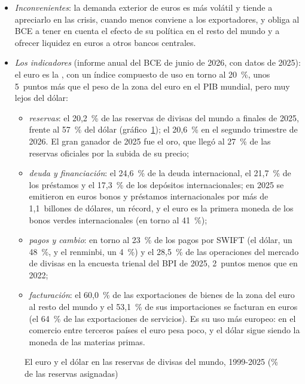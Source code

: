 \documentclass[11pt]{article}
\begin{document}
\begin{itemize}
\begin{itemize}
  \end{itemize}
\item \emph{Inconvenientes}: la demanda exterior de euros es más volátil y tiende a apreciarlo en las crisis, cuando menos conviene a los exportadores, y obliga al BCE a tener en cuenta el efecto de su política en el resto del mundo y a ofrecer liquidez en euros a otros bancos centrales.
\item \emph{Los indicadores} (informe anual del BCE de junio de 2026, con datos de 2025)\nocite{BCE2026PapelEuro}: el euro es la , con un índice compuesto de uso en torno al 20~\%, unos 5~puntos más que el peso de la zona del euro en el PIB mundial, pero muy lejos del dólar:
  \begin{itemize}
  \item \emph{reservas}: el 20,2~\% de las reservas de divisas del mundo a finales de 2025, frente al 57~\% del dólar (gráfico~\ref{fig:euro-reservas}); el 20,6~\% en el segundo trimestre de 2026\nocite{FMI2026COFERNota}. El gran ganador de 2025 fue el oro, que llegó al 27~\% de las reservas oficiales por la subida de su precio;
  \item \emph{deuda y financiación}: el 24,6~\% de la deuda internacional, el 21,7~\% de los préstamos y el 17,3~\% de los depósitos internacionales\nocite{BCE2026PapelEuro}; en 2025 se emitieron en euros bonos y préstamos internacionales por más de 1,1~billones de dólares, un récord, y el euro es la primera moneda de los bonos verdes internacionales (en torno al 41~\%);
  \item \emph{pagos y cambio}: en torno al 23~\% de los pagos por SWIFT (el dólar, un 48~\%, y el renminbi, un 4~\%) y el 28,5~\% de las operaciones del mercado de divisas en la encuesta trienal del BPI de 2025, 2~puntos menos que en 2022\nocite{BCE2026PapelEuro};
  \item \emph{facturación}: el 60,0~\% de las exportaciones de bienes de la zona del euro al resto del mundo y el 53,1~\% de sus importaciones se facturan en euros (el 64~\% de las exportaciones de servicios). Es su uso más europeo: en el comercio entre terceros países el euro pesa poco, y el dólar sigue siendo la moneda de las materias primas.
  \end{itemize}
\end{itemize}

\begin{figure}[H]
\centering
\caption{El euro y el dólar en las reservas de divisas del mundo, 1999-2025 (\% de las reservas asignadas)}\label{fig:euro-reservas}
\end{figure}
\end{document}
